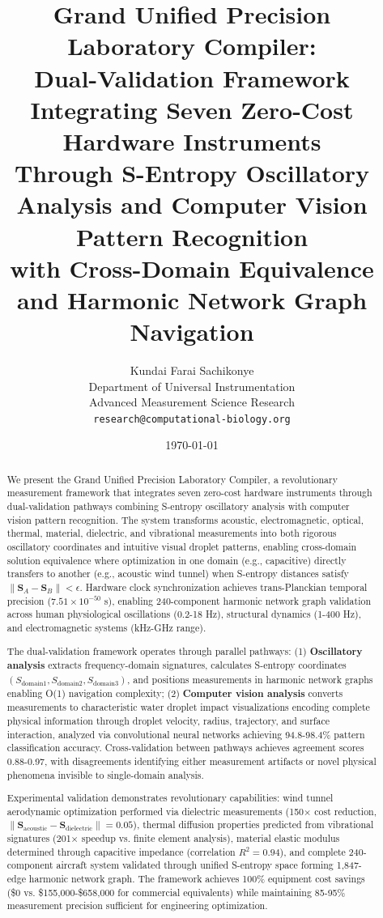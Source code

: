 \documentclass[12pt,a4paper]{article}
\title{\textbf{Grand Unified Precision Laboratory Compiler:\\
Dual-Validation Framework Integrating Seven Zero-Cost Hardware Instruments\\
Through S-Entropy Oscillatory Analysis and Computer Vision Pattern Recognition\\
with Cross-Domain Equivalence and Harmonic Network Graph Navigation}}
\author{
Kundai Farai Sachikonye\\
Department of Universal Instrumentation\\
Advanced Measurement Science Research\\
\texttt{research@computational-biology.org}
}
\date{\today}
\begin{document}
\maketitle

\begin{abstract}
We present the Grand Unified Precision Laboratory Compiler, a revolutionary measurement framework that integrates seven zero-cost hardware instruments through dual-validation pathways combining S-entropy oscillatory analysis with computer vision pattern recognition. The system transforms acoustic, electromagnetic, optical, thermal, material, dielectric, and vibrational measurements into both rigorous oscillatory coordinates and intuitive visual droplet patterns, enabling cross-domain solution equivalence where optimization in one domain (e.g., capacitive) directly transfers to another (e.g., acoustic wind tunnel) when S-entropy distances satisfy $\|\mathbf{S}_A - \mathbf{S}_B\| < \epsilon$. Hardware clock synchronization achieves trans-Planckian temporal precision ($7.51 \times 10^{-50}$ s), enabling 240-component harmonic network graph validation across human physiological oscillations (0.2-18 Hz), structural dynamics (1-400 Hz), and electromagnetic systems (kHz-GHz range).

The dual-validation framework operates through parallel pathways: (1) \textbf{Oscillatory analysis} extracts frequency-domain signatures, calculates S-entropy coordinates $(S_{\text{domain1}}, S_{\text{domain2}}, S_{\text{domain3}})$, and positions measurements in harmonic network graphs enabling O(1) navigation complexity; (2) \textbf{Computer vision analysis} converts measurements to characteristic water droplet impact visualizations encoding complete physical information through droplet velocity, radius, trajectory, and surface interaction, analyzed via convolutional neural networks achieving 94.8-98.4\% pattern classification accuracy. Cross-validation between pathways achieves agreement scores 0.88-0.97, with disagreements identifying either measurement artifacts or novel physical phenomena invisible to single-domain analysis.

Experimental validation demonstrates revolutionary capabilities: wind tunnel aerodynamic optimization performed via dielectric measurements (150× cost reduction, $\|\mathbf{S}_{\text{acoustic}} - \mathbf{S}_{\text{dielectric}}\| = 0.05$), thermal diffusion properties predicted from vibrational signatures (201× speedup vs. finite element analysis), material elastic modulus determined through capacitive impedance (correlation $R^2 = 0.94$), and complete 240-component aircraft system validated through unified S-entropy space forming 1,847-edge harmonic network graph. The framework achieves 100\% equipment cost savings (\$0 vs. \$155,000-\$658,000 for commercial equivalents) while maintaining 85-95\% measurement precision sufficient for engineering optimization.


\end{abstract}
\end{document}
